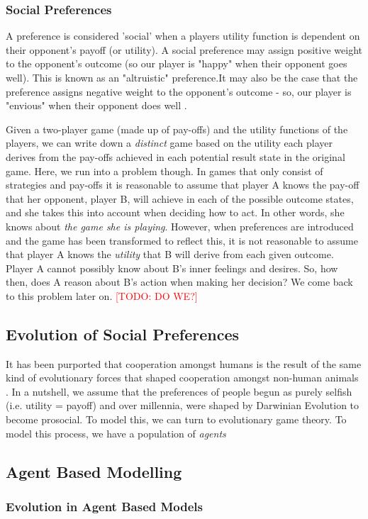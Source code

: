 \documentclass[12pt]{article}
\newcommand{\todo}[1]{\textcolor{red}{[TODO: #1]}\PackageWarning{TODO:}{#1!}}
\newcommand*{\np}{\par\noindent\newline}
\begin{document}
\subsubsection{Social Preferences}
A preference is considered 'social' when a players utility function is
dependent on their opponent's payoff (or utility). A social preference may
assign positive weight to the opponent's outcome (so our player is "happy" when
their opponent goes well). This is known as an "altruistic" preference.It may
also be the case that the preference assigns negative weight to the opponent's
outcome - so, our player is "envious" when their opponent does well
\cite{angner_course_2012}.
\np Given a two-player game (made up of pay-offs) and the utility functions of
the players, we can write down a \textit{distinct} game based on the utility
each player derives from the pay-offs achieved in each potential result state
in the original game. Here, we run into a problem though. In games that
only consist of strategies and pay-offs it is reasonable to assume that player
A knows the pay-off that her opponent, player B, will achieve in each of the
possible outcome states, and she takes this into account when deciding how to
act. In other words, she knows about \textit{the game she is playing}. However,
when preferences are introduced and the game has been transformed to reflect
this, it is not reasonable to assume that player A knows the \textit{utility}
that B will derive from each given outcome. Player A cannot possibly know about
B's inner feelings and desires. So, how then, does A reason about B's action
when making her decision? We come back to this problem later on. \todo{DO WE?}
\subsection{Evolution of Social Preferences}
It has been purported that cooperation amongst humans is the result of the
same kind of evolutionary forces that shaped cooperation amongst non-human
animals \cite{silk_evolution_2016}. In a nutshell, we assume that the
preferences of people begun as purely selfish (i.e. utility = payoff) and over
millennia, were shaped by Darwinian Evolution to become prosocial. To model
this, we can turn to evolutionary game theory. To model this process, we have a
population of \textit{agents} 
\subsection{Agent Based Modelling}
\subsubsection{Evolution in Agent Based Models}
\end{document}
